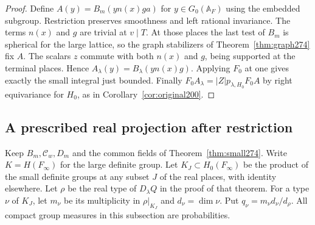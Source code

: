 \documentclass[a4paper,11pt]{article}
\theoremstyle{definition}
\theoremstyle{remark}
\numberwithin{equation}{section}
\begin{document}
\begin{proof}
Define \(A(y)=B_m(y n(x)g a)\) for \(y\in G_0(\mathbb A_F)\)
using the embedded subgroup. Restriction preserves smoothness
and left rational invariance. The terms \(n(x)\) and \(g\)
are trivial at \(v\mid T\). At those places the last test of
\(B_m\) is spherical for the large lattice, so the graph
stabilizers of Theorem~\ref{thm:graph274} fix \(A\). The
scalars \(z\) commute with both \(n(x)\) and \(g\), being
supported at the terminal places. Hence
\(A_\lambda(y)=B_\lambda(y n(x)g)\). Applying \(F_0\) at
one gives exactly the small integral just bounded. Finally
\(F_0 A_\lambda=|Z|p_{\lambda,H_0}F_0A\) by right equivariance
for \(H_0\), as in Corollary~\ref{cor:original200}.
\end{proof}

\subsection{A prescribed real projection after restriction}\label{nav:VII-47}
Keep \(B_m,\mathcal C_w,D_m\) and the common fields of
Theorem~\ref{thm:small274}. Write \(K=H(F_\infty)\) for the
large definite group. Let \(K_J\subset H_0(F_\infty)\) be the
product of the small definite groups at any subset \(J\) of
the real places, with identity elsewhere. Let \(\rho\) be
the real type of \(D_\lambda Q\) in the proof of that theorem.
For a type \(\nu\) of \(K_J\), let \(m_\nu\) be its multiplicity
in \(\rho|_{K_J}\) and \(d_\nu=\dim\nu\). Put
\(q_\nu=m_\nu d_\nu/d_\rho\). All compact group measures
in this subsection are probabilities.
\end{document}
